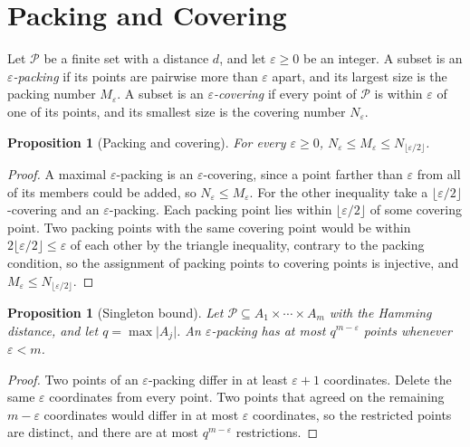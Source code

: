 \documentclass[11pt,twoside,openright]{book}
\theoremstyle{plain}
\newtheorem{proposition}[theorem]{Proposition}
\theoremstyle{definition}
\theoremstyle{remark}
\begin{document}
\section{Packing and Covering}\label{sec:packapp}

Let $\mathcal P$ be a finite set with a distance $d$, and let $\varepsilon\ge0$ be an integer. A subset is an \emph{$\varepsilon$-packing} if its points are pairwise more than $\varepsilon$ apart, and its largest size is the packing number $M_\varepsilon$. A subset is an \emph{$\varepsilon$-covering} if every point of $\mathcal P$ is within $\varepsilon$ of one of its points, and its smallest size is the covering number $N_\varepsilon$.

\begin{proposition}[Packing and covering]\label{prop:pcapp}
For every $\varepsilon\ge0$, $N_\varepsilon\le M_\varepsilon\le N_{\lfloor\varepsilon/2\rfloor}$.
\end{proposition}

\begin{proof}
A maximal $\varepsilon$-packing is an $\varepsilon$-covering, since a point farther than $\varepsilon$ from all of its members could be added, so $N_\varepsilon\le M_\varepsilon$. For the other inequality take a $\lfloor\varepsilon/2\rfloor$-covering and an $\varepsilon$-packing. Each packing point lies within $\lfloor\varepsilon/2\rfloor$ of some covering point. Two packing points with the same covering point would be within $2\lfloor\varepsilon/2\rfloor\le\varepsilon$ of each other by the triangle inequality, contrary to the packing condition, so the assignment of packing points to covering points is injective, and $M_\varepsilon\le N_{\lfloor\varepsilon/2\rfloor}$.
\end{proof}

\begin{proposition}[Singleton bound]\label{prop:singapp}
Let $\mathcal P\subseteq A_1\times\cdots\times A_m$ with the Hamming distance, and let $q=\max\lvert A_j\rvert$. An $\varepsilon$-packing has at most $q^{m-\varepsilon}$ points whenever $\varepsilon<m$.
\end{proposition}

\begin{proof}
Two points of an $\varepsilon$-packing differ in at least $\varepsilon+1$ coordinates. Delete the same $\varepsilon$ coordinates from every point. Two points that agreed on the remaining $m-\varepsilon$ coordinates would differ in at most $\varepsilon$ coordinates, so the restricted points are distinct, and there are at most $q^{m-\varepsilon}$ restrictions.
\end{proof}
\end{document}
